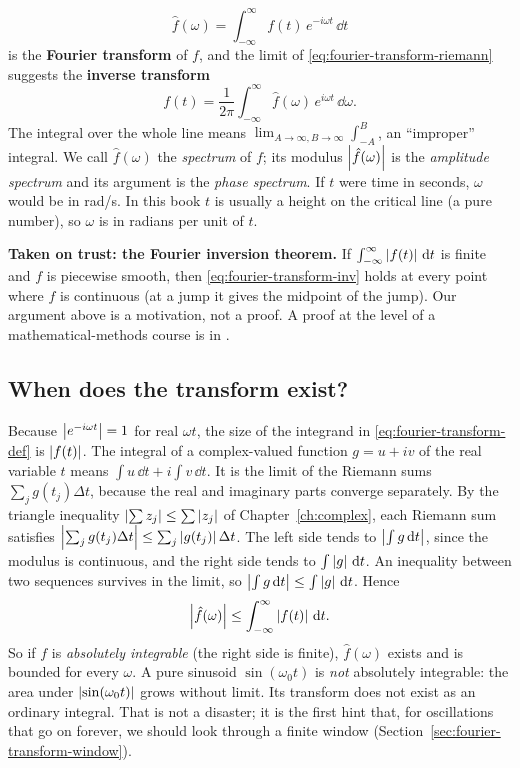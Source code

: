 \begin{equation}
\boxed{\;\hat f(\omega)=\int_{-\infty}^{\infty}f(t)\,e^{-i\omega t}\,\dd t\;}
\label{eq:fourier-transform-def}
\end{equation}
is the \textbf{Fourier transform} of $f$, and the limit of \eqref{eq:fourier-transform-riemann} suggests the \textbf{inverse transform}
\begin{equation}
f(t)=\frac{1}{2\pi}\int_{-\infty}^{\infty}\hat f(\omega)\,e^{i\omega t}\,\dd\omega .
\label{eq:fourier-transform-inv}
\end{equation}
The integral over the whole line means $\lim_{A\to\infty,B\to\infty}\int_{-A}^{B}$, an ``improper'' integral. We call $\hat f(\omega)$ the \emph{spectrum} of $f$; its modulus $\left\lvert \hat f(\omega)\right\rvert$ is the \emph{amplitude spectrum} and its argument is the \emph{phase spectrum}. If $t$ were time in seconds, $\omega$ would be in rad/s. In this book $t$ is usually a height on the critical line (a pure number), so $\omega$ is in radians per unit of $t$.

\begin{beyond}
\textbf{Taken on trust: the Fourier inversion theorem.} If $\int_{-\infty}^{\infty}\left\lvert f(t)\right\rvert\,\mathrm{d} t$ is finite and $f$ is piecewise smooth, then \eqref{eq:fourier-transform-inv} holds at every point where $f$ is continuous (at a jump it gives the midpoint of the jump). Our argument above is a motivation, not a proof. A proof at the level of a mathematical-methods course is in \cite{rhb}.
\end{beyond}

\subsection{When does the transform exist?}

Because $\left\lvert e^{-i\omega t}\right\rvert=1$ for real $\omega t$, the size of the integrand in \eqref{eq:fourier-transform-def} is $\left\lvert f(t)\right\rvert$. The integral of a complex-valued function $g=u+iv$ of the real variable $t$ means $\int u\,\dd t+i\int v\,\dd t$. It is the limit of the Riemann sums $\sum_j g(t_j)\Delta t$, because the real and imaginary parts converge separately. By the triangle inequality $\left\lvert \sum z_j\right\rvert\le\sum\left\lvert z_j\right\rvert$ of Chapter~\ref{ch:complex}, each Riemann sum satisfies $\left\lvert \sum_j g(t_j)\Delta t\right\rvert\le\sum_j\left\lvert g(t_j)\right\rvert\Delta t$. The left side tends to $\left\lvert \int g\,\mathrm{d} t\right\rvert$, since the modulus is continuous, and the right side tends to $\int\left\lvert g\right\rvert\,\mathrm{d} t$. An inequality between two sequences survives in the limit, so $\left\lvert \int g\,\mathrm{d} t\right\rvert\le\int\left\lvert g\right\rvert\,\mathrm{d} t$. Hence
\begin{equation}
\left\lvert \hat f(\omega)\right\rvert\le\int_{-\infty}^{\infty}\left\lvert f(t)\right\rvert\,\mathrm{d} t .
\label{eq:fourier-transform-bound}
\end{equation}
So if $f$ is \emph{absolutely integrable} (the right side is finite), $\hat f(\omega)$ exists and is bounded for every $\omega$. A pure sinusoid $\sin(\omega_0 t)$ is \emph{not} absolutely integrable: the area under $\left\lvert \sin(\omega_0 t)\right\rvert$ grows without limit. Its transform does not exist as an ordinary integral. That is not a disaster; it is the first hint that, for oscillations that go on forever, we should look through a finite window (Section~\ref{sec:fourier-transform-window}).

